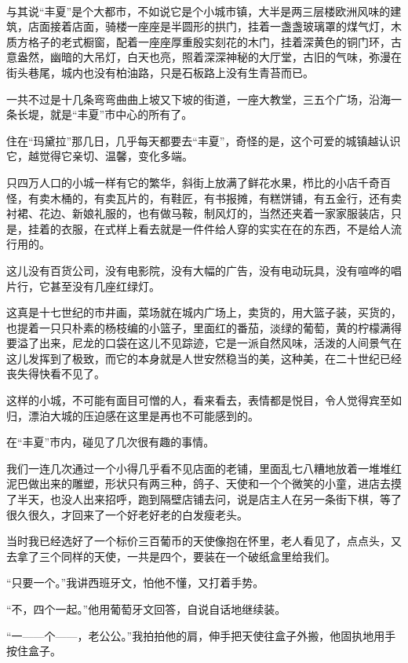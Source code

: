 \par  
\par 与其说“丰夏”是个大都市，不如说它是个小城市镇，大半是两三层楼欧洲风味的建筑，店面接着店面，骑楼一座座是半圆形的拱门，挂着一盏盏玻璃罩的煤气灯，木质方格子的老式橱窗，配着一座座厚重殷实刻花的木门，挂着深黄色的铜门环，古意盎然，幽暗的大吊灯，白天也亮，照着深深神秘的大厅堂，古旧的气味，弥漫在街头巷尾，城内也没有柏油路，只是石板路上没有生青苔而已。
\par 一共不过是十几条弯弯曲曲上坡又下坡的街道，一座大教堂，三五个广场，沿海一条长堤，就是“丰夏”市中心的所有了。
\par 住在“玛黛拉”那几日，几乎每天都要去“丰夏”，奇怪的是，这个可爱的城镇越认识它，越觉得它亲切、温馨，变化多端。
\par 只四万人口的小城一样有它的繁华，斜街上放满了鲜花水果，栉比的小店千奇百怪，有卖木桶的，有卖瓦片的，有鞋匠，有书报摊，有糕饼铺，有五金行，还有卖衬裙、花边、新娘礼服的，也有做马鞍，制风灯的，当然还夹着一家家服装店，只是，挂着的衣服，在式样上看去就是一件件给人穿的实实在在的东西，不是给人流行用的。
\par 这儿没有百货公司，没有电影院，没有大幅的广告，没有电动玩具，没有喧哗的唱片行，它甚至没有几座红绿灯。
\par 这真是十七世纪的市井画，菜场就在城内广场上，卖货的，用大篮子装，买货的，也提着一只只朴素的杨枝编的小篮子，里面红的番茄，淡绿的葡萄，黄的柠檬满得要溢了出来，尼龙的口袋在这儿不见踪迹，它是一派自然风味，活泼的人间景气在这儿发挥到了极致，而它的本身就是人世安然稳当的美，这种美，在二十世纪已经丧失得快看不见了。
\par 这样的小城，不可能有面目可憎的人，看来看去，表情都是悦目，令人觉得宾至如归，漂泊大城的压迫感在这里是再也不可能感到的。
\par 在“丰夏”市内，碰见了几次很有趣的事情。
\par 我们一连几次通过一个小得几乎看不见店面的老铺，里面乱七八糟地放着一堆堆红泥巴做出来的雕塑，形状只有两三种，鸽子、天使和一个个微笑的小童，进店去摸了半天，也没人出来招呼，跑到隔壁店铺去问，说是店主人在另一条街下棋，等了很久很久，才回来了一个好老好老的白发瘦老头。
\par 当时我已经选好了一个标价三百葡币的天使像抱在怀里，老人看见了，点点头，又去拿了三个同样的天使，一共是四个，要装在一个破纸盒里给我们。
\par “只要一个。”我讲西班牙文，怕他不懂，又打着手势。
\par “不，四个一起。”他用葡萄牙文回答，自说自话地继续装。
\par “一——个——，老公公。”我拍拍他的肩，伸手把天使往盒子外搬，他固执地用手按住盒子。
